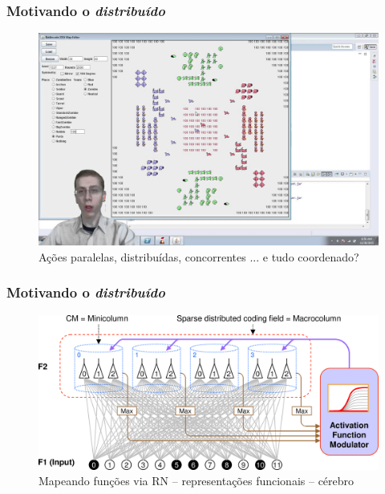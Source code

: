 \begin{frame} %

  \frametitle{Motivando o \textit{distribuído}}
        
\begin{figure}[!ht]
\centering
\includegraphics[height =.6\textheight,width=.7\textwidth]{figuras/DAI_motivation01.jpg}
\caption{Ações paralelas, distribuídas, concorrentes ... e tudo coordenado?}
\end{figure}
    
\end{frame}


\begin{frame} %

  \frametitle{Motivando o \textit{distribuído}}
        
\begin{figure}[!ht]
\centering
\includegraphics[height =.6\textheight,width=.8\textwidth]{figuras/DAI_motivation02.jpg}
\caption{Mapeando funções via RN -- representações funcionais -- cérebro}
\end{figure}
    
\end{frame}


